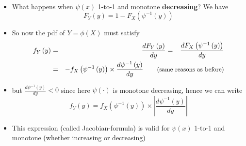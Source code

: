 \documentclass[smaller]{beamer}\usepackage[]{graphicx}\usepackage[]{color}
\newenvironment{stepitemize}{\begin{itemize}[<+->]}{\end{itemize} }
\begin{document}
\begin{frame}{\secname}
  \framesubtitle{\subsecname}

  \begin{stepitemize}
  \item What happens when $\psi \left( x\right) $ 1-to-1 and monotone \textbf{%
  decreasing}? We have%
  \begin{equation*}
  F_{Y}\left( y\right) =1-F_{X}\left( \psi ^{-1}\left( y\right) \right)
  \end{equation*}

  \item So now the pdf of $Y=\phi \left( X\right) $ must satisfy
  \begin{eqnarray*}
  f_{Y}\left( y\right) &=&\frac{dF_{Y}\left( y\right) }{dy}=-\frac{%
  dF_{X}\left( \psi ^{-1}\left( y\right) \right) }{dy} \\
  &=&-f_{X}\left( \psi ^{-1}\left( y\right) \right) \times \frac{d\psi
  ^{-1}\left( y\right) }{dy}\qquad \text{{\small (same reasons as before)}}
  \end{eqnarray*}

  \item but $\frac{d\psi ^{-1}\left( y\right) }{dy}<0$ since here $\psi \left(
  \cdot \right) $ is monotone decreasing, hence we can write%
  \begin{equation*}
  f_{Y}\left( y\right) =f_{X}\left( \psi ^{-1}\left( y\right) \right) \times
  \left\vert \frac{d\psi ^{-1}\left( y\right) }{dy}\right\vert
  \end{equation*}

  \item This expression (called Jacobian-formula) is valid for $\psi \left( x\right) $ 1-to-1 and
  monotone (whether increasing or decreasing)
  \end{stepitemize}
\end{frame}
\end{document}
